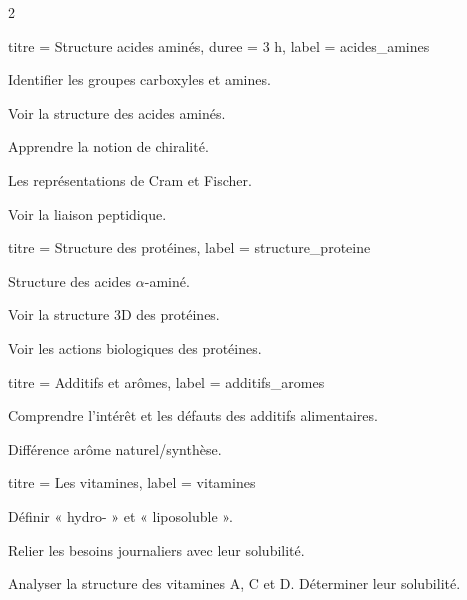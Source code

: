 \begin{multicols}{2}
  \begin{activite}{titre = Structure acides aminés, duree = 3 h, label = acides_amines}
    \begin{prerequis}
      \item Identifier les groupes carboxyles et amines.
    \end{prerequis}
    \begin{objectifs}  
      \item Voir la structure des acides aminés.
      \item Apprendre la notion de chiralité.
      \item Les représentations de Cram et Fischer.
      \item Voir la liaison peptidique.
    \end{objectifs}
  \end{activite}
  \hfill {}

  \begin{activite}{titre = Structure des protéines, label = structure_proteine}
    \begin{prerequis}
      \item Structure des acides $\alpha$-aminé.
    \end{prerequis}
    \begin{objectifs}
      \item Voir la structure 3D des protéines.
      \item Voir les actions biologiques des protéines.
    \end{objectifs}
  \end{activite}
  \smallskip

  \setcounter{activiteNum}{5}
  \begin{activite}{titre = Additifs et arômes, label = additifs_aromes}
    \begin{objectifs}
      \item Comprendre l'intérêt et les défauts des additifs alimentaires.
      \item Différence arôme naturel/synthèse.
    \end{objectifs}
  \end{activite}

  \setcounter{activiteNum}{3}
  \begin{activite}{titre = Les vitamines, label = vitamines}
    \begin{objectifs}
      \item Définir « hydro- » et « liposoluble ».
      \item Relier les besoins journaliers avec leur solubilité.
      \item Analyser la structure des vitamines A, C et D. Déterminer leur solubilité.
    \end{objectifs}
  \end{activite}
  \hfill
  

\end{multicols}
